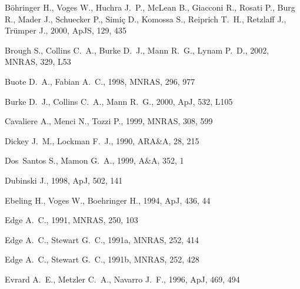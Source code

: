 \documentclass[usenatbib]{mn2e}
\begin{document}
\begin{thebibliography}{}
B{\" o}hringer H.,  Voges W.,  Huchra J.~P.,  McLean B.,  Giacconi R.,  Rosati
  P.,  Burg R.,  Mader J.,  Schuecker P.,  Simi{\c c} D.,  Komossa S.,
  Reiprich T.~H.,  Retzlaff J.,    Tr{\" u}mper J.,  2000, ApJS, 129, 435

Brough S.,  Collins C.~A.,  Burke D.~J.,  Mann R.~G.,    Lynam P.~D.,  2002,
  MNRAS, 329, L53

Buote D.~A.,  Fabian A.~C.,  1998, MNRAS, 296, 977

Burke D.~J.,  Collins C.~A.,    Mann R.~G.,  2000, ApJ, 532, L105

Cavaliere A.,  Menci N.,    Tozzi P.,  1999, MNRAS, 308, 599

Dickey J.~M.,  Lockman F.~J.,  1990, ARA\&A, 28, 215

Dos~Santos S.,  Mamon G.~A.,  1999, A\&A, 352, 1

Dubinski J.,  1998, ApJ, 502, 141

Ebeling H.,  Voges W.,    Boehringer H.,  1994, ApJ, 436, 44

Edge A.~C.,  1991, MNRAS, 250, 103

Edge A.~C.,  Stewart G.~C.,  1991a, MNRAS, 252, 414

Edge A.~C.,  Stewart G.~C.,  1991b, MNRAS, 252, 428

Evrard A.~E.,  Metzler C.~A.,    Navarro J.~F.,  1996, ApJ, 469, 494


\end{thebibliography}
\end{document}

